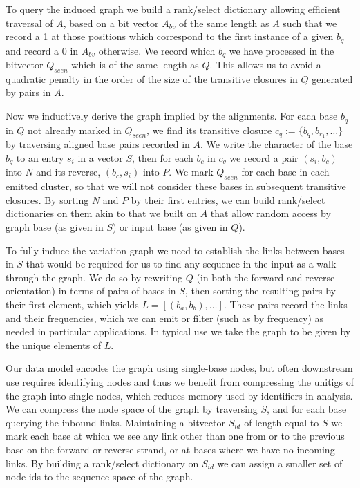 \documentclass{bioinfo}
\begin{document}
    To query the induced graph we build a rank/select dictionary allowing efficient traversal of $A$, based on a bit vector $A_{bv}$ of the same length as $A$ such that we record a 1 at those positions which correspond to the first instance of a given $b_{q}$ and record a 0 in $A_{bv}$ otherwise.
    We record which $b_{q}$ we have processed in the bitvector $Q_{seen}$ which is of the same length as $Q$.
    This allows us to avoid a quadratic penalty in the order of the size of the transitive closures in $Q$ generated by pairs in $A$.

    Now we inductively derive the graph implied by the alignments.
    For each base $b_{q}$ in $Q$ not already marked in $Q_{seen}$, we find its transitive closure $c_{q} := \{b_{q}, b_{r_{1}}, \ldots \}$ by traversing aligned base pairs recorded in $A$.
    We write the character of the base $b_{q}$ to an entry $s_i$ in a vector $S$, then for each $b_{c}$ in $c_{q}$ we record a pair $(s_{i}, b_{c})$ into $N$ and its reverse, $(b_{c}, s_{i})$ into $P$.
    We mark $Q_{seen}$ for each base in each emitted cluster, so that we will not consider these bases in subsequent transitive closures.
    By sorting $N$ and $P$ by their first entries, we can build rank/select dictionaries on them akin to that we built on $A$ that allow random access by graph base (as given in $S$) or input base (as given in $Q$).

    To fully induce the variation graph we need to establish the links between bases in $S$ that would be required for us to find any sequence in the input as a walk through the graph.
    We do so by rewriting $Q$ (in both the forward and reverse orientation) in terms of pairs of bases in $S$, then sorting the resulting pairs by their first element, which yields $L = [(b_{a}, b_{b}), \ldots ]$.
    These pairs record the links and their frequencies, which we can emit or filter (such as by frequency) as needed in particular applications.
    In typical use we take the graph to be given by the unique elements of $L$.

    Our data model encodes the graph using single-base nodes, but often downstream use requires identifying nodes and thus we benefit from compressing the unitigs of the graph into single nodes, which reduces memory used by identifiers in analysis.
    We can compress the node space of the graph by traversing $S$, and for each base querying the inbound links.
    Maintaining a bitvector $S_{id}$ of length equal to $S$ we mark each base at which we see any link other than one from or to the previous base on the forward or reverse strand, or at bases where we have no incoming links.
    By building a rank/select dictionary on $S_{id}$ we can assign a smaller set of node ids to the sequence space of the graph.
\end{document}
